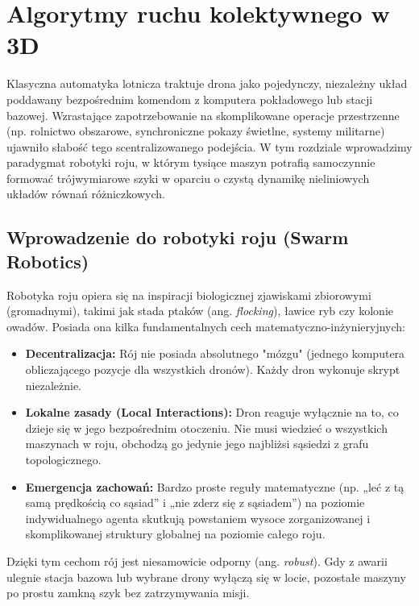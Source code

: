 \chapter{Algorytmy ruchu kolektywnego w 3D}

Klasyczna automatyka lotnicza traktuje drona jako pojedynczy, niezależny układ poddawany bezpośrednim komendom z komputera pokładowego lub stacji bazowej. Wzrastające zapotrzebowanie na skomplikowane operacje przestrzenne (np. rolnictwo obszarowe, synchroniczne pokazy świetlne, systemy militarne) ujawniło słabość tego scentralizowanego podejścia. W tym rozdziale wprowadzimy paradygmat robotyki roju, w którym tysiące maszyn potrafią samoczynnie formować trójwymiarowe szyki w oparciu o czystą dynamikę nieliniowych układów równań różniczkowych.

\section{Wprowadzenie do robotyki roju (Swarm Robotics)}

Robotyka roju opiera się na inspiracji biologicznej zjawiskami zbiorowymi (gromadnymi), takimi jak stada ptaków (ang. \textit{flocking}), ławice ryb czy kolonie owadów. Posiada ona kilka fundamentalnych cech matematyczno-inżynieryjnych:
\begin{itemize}
    \item \textbf{Decentralizacja:} Rój nie posiada absolutnego "mózgu" (jednego komputera obliczającego pozycje dla wszystkich dronów). Każdy dron wykonuje skrypt niezależnie.
    \item \textbf{Lokalne zasady (Local Interactions):} Dron reaguje wyłącznie na to, co dzieje się w jego bezpośrednim otoczeniu. Nie musi wiedzieć o wszystkich maszynach w roju, obchodzą go jedynie jego najbliżsi sąsiedzi z grafu topologicznego.
    \item \textbf{Emergencja zachowań:} Bardzo proste reguły matematyczne (np. „leć z tą samą prędkością co sąsiad” i „nie zderz się z sąsiadem”) na poziomie indywidualnego agenta skutkują powstaniem wysoce zorganizowanej i skomplikowanej struktury globalnej na poziomie całego roju.
\end{itemize}
Dzięki tym cechom rój jest niesamowicie odporny (ang. \textit{robust}). Gdy z awarii ulegnie stacja bazowa lub wybrane drony wyłączą się w locie, pozostałe maszyny po prostu zamkną szyk bez zatrzymywania misji.

